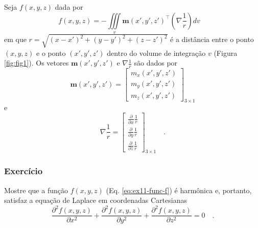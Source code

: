 \documentclass[10pt,a4paper,fleqn]{article}
\begin{document}
Seja $f(x,y,z)$ dada por
\begin{equation}
f(x,y,z) = - \iiint \limits_{v} \mathbf{m}(x',y',z')^{\intercal}
                                \left( \nabla \frac{1}{r} \right)
                                 d v \quad
\label{eq:ex11-func-f}
\end{equation}
em que $r = \sqrt{(x-x')^{2}+(y-y')^{2}+(z-z')^{2}}$ \'{e} a dist\^{a}ncia entre o ponto $(x,y,z)$
e o ponto $(x',y',z')$ dentro do volume de integra\c{c}\~{a}o $v$ (Figura \ref{fig:fig1}). Os vetores
$\mathbf{m}(x',y',z')$ e $\nabla \frac{1}{r}$ s\~{a}o dados por
\begin{equation}
\mathbf{m}(x',y',z') =
\left[
\begin{array}{c}
m_{x}(x',y',z') \\
m_{y}(x',y',z') \\
m_{z}(x',y',z')
\end{array}
\right]_{3 \times 1}
\label{eq:ex11-mag-vec}
\end{equation}
e
\begin{equation}
\nabla \frac{1}{r} =
\left[
\begin{array}{c}
\frac{\partial}{\partial x} \frac{1}{r} \\
\frac{\partial}{\partial y} \frac{1}{r} \\
\frac{\partial}{\partial z} \frac{1}{r}
\end{array}
\right]_{3 \times 1} \quad .
\label{eq:ex11-grad-invr}
\end{equation}

\begin{flushleft}
\dotfill
\end{flushleft}



\subsubsection{Exerc\'{i}cio}

Mostre que a fun\c{c}\~{a}o $f(x,y,z)$ (Eq. \ref{eq:ex11-func-f}) \'{e} harm\^{o}nica e, portanto, satisfaz
a equa\c{c}\~{a}o de Laplace em coordenadas Cartesianas
\begin{equation}
\frac{\partial^{2} f(x,y,z)}{\partial x^{2}} +
\frac{\partial^{2} f(x,y,z)}{\partial y^{2}} +
\frac{\partial^{2} f(x,y,z)}{\partial z^{2}} = 0 \quad .
\label{eq:ex11-Laplace}
\end{equation}

\begin{flushleft}
\dotfill
\end{flushleft}
\end{document}
